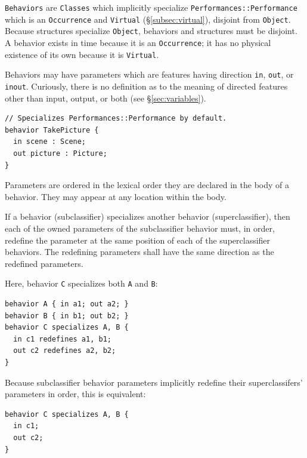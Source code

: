 

\texttt{Behaviors} are \texttt{Classes} which implicitly specialize \texttt{Performances::Performance} which is an \texttt{Occur\-rence} and \texttt{Virtual} (\S\ref{subsec:virtual}), disjoint from \texttt{Object}.  Because structures specialize \texttt{Object}, behaviors and structures must be disjoint.  A behavior exists in time because it is an \texttt{Occur\-rence}; it has no physical existence of its own because it is \texttt{Virtual}.

Behaviors may have parameters which are features having direction \texttt{in}, \texttt{out}, or \texttt{inout}.  Curiously, there is no definition as to the meaning of directed features other than input, output, or both (see \S\ref{sec:variables}).

\begin{lstlisting}
// Specializes Performances::Performance by default.
behavior TakePicture {
  in scene : Scene;
  out picture : Picture;
}
\end{lstlisting}

Parameters are ordered in the lexical order they are declared in the body of a behavior. They may appear at any
location within the body.

If a behavior (subclassifier) specializes another behavior (superclassifier), then each of the owned parameters
of the subclassifier behavior must, in order, redefine the parameter at the same position of each of the superclassifier
behaviors. The redefining parameters shall have the same direction as the redefined parameters.

Here, behavior \texttt{C} specializes both \texttt{A} and \texttt{B}:
\begin{lstlisting}
behavior A { in a1; out a2; }
behavior B { in b1; out b2; }
behavior C specializes A, B {
  in c1 redefines a1, b1;
  out c2 redefines a2, b2;
}
\end{lstlisting}

Because subclassifier behavior parameters implicitly redefine their superclassifers' parameters in order, this is equivalent:
\begin{lstlisting}
behavior C specializes A, B {
  in c1;
  out c2;
}
\end{lstlisting}


